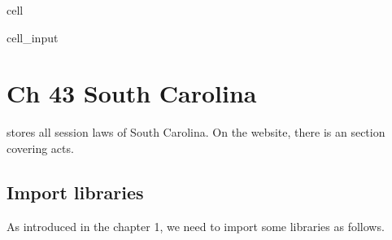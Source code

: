 \documentclass[letterpaper,10pt,english]{jupyterBook}
\begin{document}
\begin{sphinxuseclass}{cell}\begin{sphinxVerbatimInput}

\begin{sphinxuseclass}{cell_input}
\begin{sphinxVerbatim}[commandchars=\\\{\}]
  
     

\end{sphinxVerbatim}

\end{sphinxuseclass}\end{sphinxVerbatimInput}

\end{sphinxuseclass}
\sphinxstepscope


\chapter{Ch 43 South Carolina}
\label{\detokenize{ch43:ch-43-south-carolina}}\label{\detokenize{ch43::doc}}
\sphinxAtStartPar
{} stores all session laws of South Carolina. On the website, there is an  section covering acts.

\sphinxAtStartPar
{}


\section{Import libraries}
\label{\detokenize{ch43:import-libraries}}
\sphinxAtStartPar
As introduced in the chapter 1, we need to import some libraries as follows.
\end{document}
